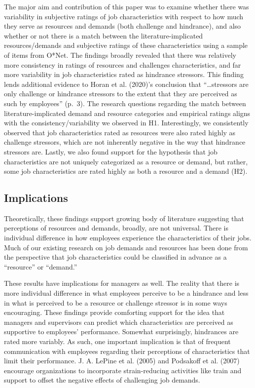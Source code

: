 \documentclass[
  english,
  man]{apa6}
\begin{document}
The major aim and contribution of this paper was to examine whether there was variability in subjective ratings of job characteristics with respect to how much they serve as resources and demands (both challenge and hindrance), and also whether or not there is a match between the literature-implicated resources/demands and subjective ratings of these characteristics using a sample of items from O*Net. The findings broadly revealed that there was relatively more consistency in ratings of resources and challenges characteristics, and far more variability in job characteristics rated as hindrance stressors. This finding lends additional evidence to Horan et al. (2020)'s conclusion that ``\ldots stressors are only challenge or hindrance stressors to the extent that they are perceived as such by employees'' (p.~3). The research questions regarding the match between literature-implicated demand and resource categories and empirical ratings aligns with the consistency/variability we observed in H1. Interestingly, we consistently observed that job characteristics rated as resources were also rated highly as challenge stressors, which are not inherently negative in the way that hindrance stressors are. Lastly, we also found support for the hypothesis that job characteristics are not uniquely categorized as a resource or demand, but rather, some job characteristics are rated highly as both a resource and a demand (H2).

\hypertarget{implications}{%
\subsection{Implications}\label{implications}}

Theoretically, these findings support growing body of literature suggesting that perceptions of resources and demands, broadly, are not universal. There is individual difference in how employees experience the characteristics of their jobs. Much of our existing research on job demands and resources has been done from the perspective that job characteristics could be classified in advance as a ``resource'' or ``demand.''

These results have implications for managers as well. The reality that there is more individual difference in what employees perceive to be a hindrance and less in what is perceived to be a resource or challenge stressor is in some ways encouraging. These findings provide comforting support for the idea that managers and supervisors can predict which characteristics are perceived as supportive to employees' performance. Somewhat surprisingly, hindrances are rated more variably. As such, one important implication is that of frequent communication with employees regarding their perceptions of characteristics that limit their performance. J. A. LePine et al. (2005) and Podsakoff et al. (2007) encourage organizations to incorporate strain-reducing activities like train and support to offset the negative effects of challenging job demands.
\end{document}
